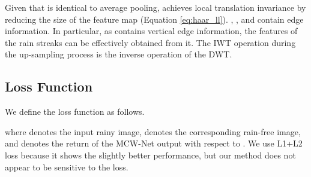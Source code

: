 \documentclass[a4paper,fleqn]{cas-dc}
\begin{document}
Given that  is identical to average pooling,  achieves local translation invariance by reducing the size of the feature map (Equation \ref{eq:haar_ll}). , , and  contain edge information. In particular, as  contains vertical edge information, the features of the rain streaks can be effectively obtained from it. The IWT operation during the up-sampling process is the inverse operation of the DWT.


















\subsection{Loss Function}
We define the loss function  as follows. 


where  denotes the input rainy image,  denotes the corresponding rain-free image, and  denotes the return of the MCW-Net output with respect to . We use L1+L2 loss because it shows the slightly better performance, but our method does not appear to be sensitive to the loss.
\end{document}

